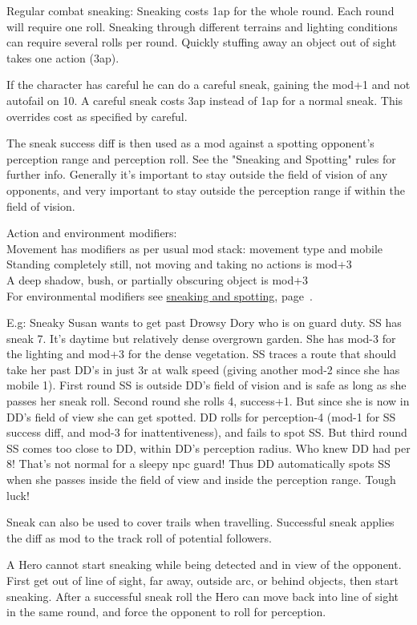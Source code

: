 Regular combat sneaking: Sneaking costs 1ap for the whole round. Each round will require one roll. Sneaking through different terrains and lighting conditions can require several rolls per round. Quickly stuffing away an object out of sight takes one action (3ap).

If the character has careful he can do a careful sneak, gaining the mod+1 and not autofail on 10. A careful sneak costs 3ap instead of 1ap for a normal sneak. This overrides cost as specified by careful.

The sneak success diff is then used as a mod against a spotting opponent's perception range and perception roll. See the "Sneaking and Spotting" rules for further info.
Generally it's important to stay outside the field of vision of any opponents, and very important to stay outside the perception range if within the field of vision.

Action and environment modifiers:\\
Movement has modifiers as per usual mod stack: movement type and mobile\\
Standing completely still, not moving and taking no actions is mod+3\\
A deep shadow, bush, or partially obscuring object is mod+3\\
For environmental modifiers see \hyperref[sec:sneakspot]{sneaking and spotting}, page~\pageref{sec:sneakspot}.

E.g: Sneaky Susan wants to get past Drowsy Dory who is on guard duty. SS has sneak 7. It's daytime but relatively dense overgrown garden. She has mod-3 for the lighting and mod+3 for the dense vegetation. SS traces a route that should take her past DD's in just 3r at walk speed (giving another mod-2 since she has mobile 1). First round SS is outside DD's field of vision and is safe as long as she passes her sneak roll. Second round she rolls 4, success+1. But since she is now in DD's field of view she can get spotted. DD rolls for perception-4 (mod-1 for SS success diff, and mod-3 for inattentiveness), and fails to spot SS. But third round SS comes too close to DD, within DD's perception radius. Who knew DD had per 8! That's not normal for a sleepy npc guard! Thus DD automatically spots SS when she passes inside the field of view and inside the perception range. Tough luck!

Sneak can also be used to cover trails when travelling. Successful sneak applies the diff as mod to the track roll of potential followers.

A Hero cannot start sneaking while being detected and in view of the opponent. First get out of line of sight, far away, outside arc, or behind objects, then start sneaking. After a successful sneak roll the Hero can move back into line of sight in the same round, and force the opponent to roll for perception.

